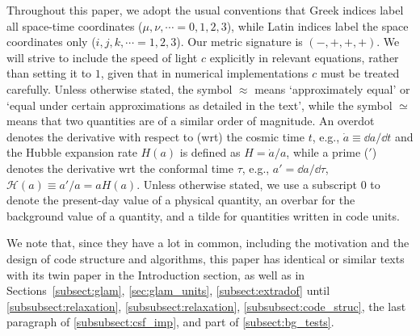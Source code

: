 Throughout this paper, we adopt the usual conventions that Greek indices label all space-time coordinates ($\mu,\nu,\cdots=0,1,2,3$), while Latin indices label the space coordinates only ($i,j,k,\cdots=1,2,3$). Our metric signature is $(-,+,+,+)$. We will strive to include the speed of light $c$ explicitly in relevant equations, rather than setting it to $1$, given that in numerical implementations $c$ must be treated carefully. Unless otherwise stated, the symbol $\approx$ means `approximately equal' or `equal under certain approximations as detailed in the text', while the symbol $\simeq$ means that two quantities are of a similar order of magnitude. An overdot denotes the derivative with respect to (wrt) the cosmic time $t$, e.g., $\dot{a} \equiv {\dd{a}}/{\dd{t}}$ and the Hubble expansion rate $H(a)$ is defined as $H=\dot{a}/a$, while a prime ($'$) denotes the derivative wrt the conformal time $\tau$, e.g., $a'=\dd{a}/\dd{\tau}$, $\mathcal{H}(a)\equiv{a}'/a=aH(a)$. Unless otherwise stated, we use a subscript $0$ to denote the present-day value of a physical quantity, an overbar for the background value of a quantity, and a tilde for quantities written in code units.

We note that, since they have a lot in common, including the motivation and the design of code structure and algorithms, this paper has identical or similar texts with its twin paper \cite{Hernandez-Aguayo:2021_twin_paper} in the Introduction section, as well as in Sections~\ref{subsect:glam}, \ref{sec:glam_units}, \ref{subsect:extradof} until \ref{subsubsect:relaxation}, \ref{subsubsect:relaxation}, \ref{subsubsect:code_struc}, the last paragraph of \ref{subsubsect:csf_imp}, and part of \ref{subsect:bg_tests}. 

